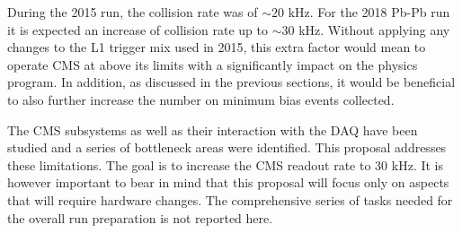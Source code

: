During the 2015 run, the collision rate was of $\sim 20$ kHz. For the 2018 Pb-Pb run it is expected an increase of collision rate up to $\sim 30$ kHz. Without applying any changes to the L1 trigger mix used in 2015, this extra factor would mean to operate CMS at above its limits with a significantly impact on the physics program. In addition, as discussed in the previous sections, it would be beneficial to also further increase the number on minimum bias events collected. 

The CMS subsystems as well as their interaction with the DAQ have been studied and a series of bottleneck areas were identified. This proposal addresses these limitations. The goal is to increase the CMS readout rate to 30 kHz. It is however important to bear in mind that this proposal will focus only on aspects that will require
hardware changes. The comprehensive series of tasks needed for the overall run preparation is not reported here. 

